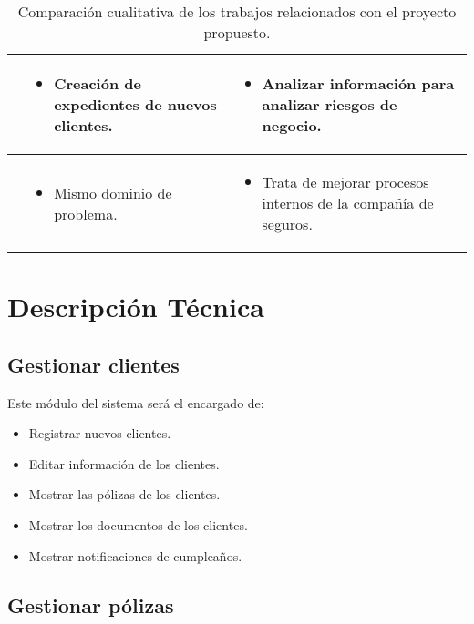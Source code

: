 \begin{table}[h!]
\begin{tabular}{p{} p{} p{}}
\midrule
\cite{pro:zurich} &
\begin{itemize}[leftmargin=*]
	\item Creación de expedientes de nuevos clientes.
\end{itemize} &
\begin{itemize}[leftmargin=*]
	\item Analizar información para analizar riesgos de negocio.
\end{itemize} \\


\midrule
\cite{pro:emi} &
\begin{itemize}[leftmargin=*]
	\item Mismo dominio de problema.  
\end{itemize} &
\begin{itemize}[leftmargin=*]
	\item Trata de mejorar procesos internos de la compañía de seguros.
\end{itemize} \\
    \bottomrule
  \end{tabular}
  \caption{Comparación cualitativa de los trabajos relacionados con el proyecto propuesto.}
  \label{table:related}
\end{table}

\section{Descripción Técnica}

\subsection*{Gestionar clientes}

Este m\'odulo del sistema ser\'a el encargado de:
\begin{itemize}
	\item Registrar nuevos clientes.
	\item Editar información de los clientes.
	\item Mostrar las pólizas de los clientes.
	\item Mostrar los documentos de los clientes.
	\item Mostrar notificaciones de cumpleaños.
\end{itemize}

\subsection*{Gestionar pólizas}

